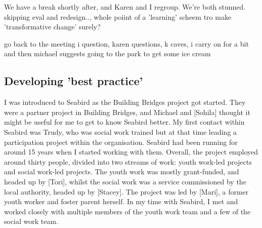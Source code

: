 We have a break shortly after, and Karen and I regroup. We're both stunned. skipping eval and redesign.., whole poiint of a 'learning' scheem tro make 'transformative change' surely?

go back to the meeting
i question, karen questions, k caves, i carry on for a bit and then michael suggests going to the park to get some ice cream






\subsection{Developing 'best practice'}
I was introduced to Seabird as the Building Bridges project got started. They were a partner project in Building Bridges, and Michael and [Sohila] thought it might be useful for me to get to know Seabird better. My first contact within Seabird was Trudy, who was social work trained but at that time leading a participation project within the organisation. Seabird had been running for around 15 years when I started working with them. Overall, the project employed around thirty people, divided into two streams of work: youth work-led projects and social work-led projects. The youth work was mostly grant-funded, and headed up by [Tori], whilst the social work was a service commissioned by the local authority, headed up by [Stacey]. The project was led by [Mari], a former youth worker and foster parent herself. In my time with Seabird, I met and worked closely with multiple members of the youth work team and a few of the social work team. 


